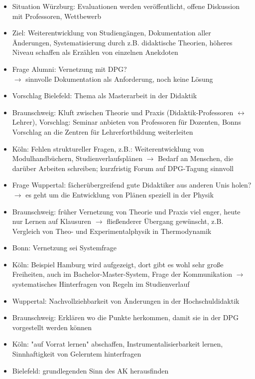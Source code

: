 \begin{itemize}
        \item Situation Würzburg: Evaluationen werden veröffentlicht, offene Diskussion mit Professoren, Wettbewerb
        \item Ziel: Weiterentwicklung von Studiengängen, Dokumentation aller Änderungen, Systematisierung durch z.B. didaktische Theorien, höheres Niveau schaffen als Erzählen von einzelnen Anekdoten
        \item Frage Alumni: Vernetzung mit DPG? \\
          $\rightarrow$ sinnvolle Dokumentation als Anforderung, noch keine Lösung
        \item Vorschlag Bielefeld: Thema als Masterarbeit in der Didaktik
        \item Braunschweig: Kluft zwischen Theorie und Praxis (Didaktik-Professoren $\leftrightarrow$ Lehrer), Vorschlag: Seminar anbieten von Professoren für Dozenten, Bonns Vorschlag an die Zentren für Lehrerfortbildung weiterleiten
        \item Köln: Fehlen struktureller Fragen, z.B.: Weiterentwicklung von Modulhandbüchern, Studienverlaufsplänen $\rightarrow$ Bedarf an Menschen, die darüber Arbeiten schreiben; kurzfristig Forum auf DPG-Tagung sinnvoll
        \item Frage Wuppertal: fächerübergreifend gute Didaktiker aus anderen Unis holen? \\
          $\rightarrow$ es geht um die Entwicklung von Plänen speziell in der Physik
        \item Braunschweig: früher Vernetzung von Theorie und Praxis viel enger, heute nur Lernen auf Klausuren $\rightarrow$ fließenderer Übergang gewünscht, z.B. Vergleich von Theo- und Experimentalphysik in Thermodynamik
        \item Bonn: Vernetzung sei Systemfrage
        \item Köln: Beispiel Hamburg wird aufgezeigt, dort gibt es wohl sehr große Freiheiten, auch im Bachelor-Master-System, Frage der Kommunikation $\rightarrow$ systematisches Hinterfragen von Regeln im Studienverlauf
        \item Wuppertal: Nachvollziehbarkeit von Änderungen in der Hochschuldidaktik
        \item Braunschweig: Erklären wo die Punkte herkommen, damit sie in der DPG vorgestellt werden können
        \item Köln: "auf Vorrat lernen" abschaffen, Instrumentalisierbarkeit lernen, Sinnhaftigkeit von Gelerntem hinterfragen
        \item Bielefeld: grundlegenden Sinn des AK herausfinden

\end{itemize}
